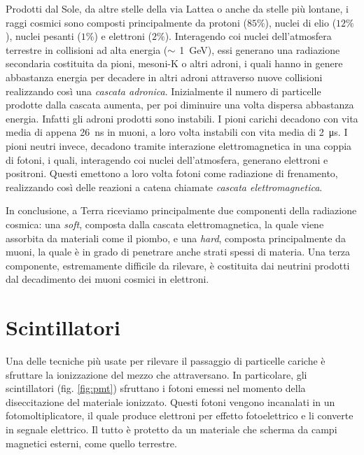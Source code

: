 \documentclass[../main.tex]{subfiles}
\begin{document}
Prodotti dal Sole, da altre stelle della via Lattea o anche da stelle più lontane, i raggi cosmici sono composti principalmente da protoni ($85\%$), nuclei di elio ($12\%$), nuclei pesanti ($1\%$) e elettroni ($2\%$). Interagendo coi nuclei dell'atmosfera terrestre in collisioni ad alta energia ($\small \sim$ \SI{1}{\GeV}), essi generano una radiazione secondaria costituita da pioni, mesoni-K o altri adroni, i quali hanno in genere abbastanza energia per decadere in altri adroni attraverso nuove collisioni realizzando così una \textit{cascata adronica}. Inizialmente il numero di particelle prodotte dalla cascata aumenta, per poi diminuire una volta dispersa abbastanza energia. Infatti gli adroni prodotti sono instabili. I pioni carichi decadono con vita media di appena \SI{26}{\ns} in muoni, a loro volta instabili con vita media di \SI{2}{\micro\s}. I pioni neutri invece, decadono tramite interazione elettromagnetica in una coppia di fotoni, i quali, interagendo coi nuclei dell'atmosfera, generano elettroni e positroni. Questi emettono a loro volta fotoni come radiazione di frenamento, realizzando così delle reazioni a catena chiamate \textit{cascata elettromagnetica}.

In conclusione, a Terra riceviamo principalmente due componenti della radiazione cosmica: una \textit{soft}, composta dalla cascata elettromagnetica, la quale viene assorbita da materiali come il piombo, e una \textit{hard}, composta principalmente da muoni, la quale è in grado di penetrare anche strati spessi di materia. 
Una terza componente, estremamente difficile da rilevare, è costituita dai neutrini prodotti dal decadimento dei muoni cosmici in elettroni.

\section{Scintillatori}
Una delle tecniche più usate per rilevare il passaggio di particelle cariche è sfruttare la ionizzazione del mezzo che attraversano. In particolare, gli scintillatori (fig. \ref{fig:pmt}) sfruttano i fotoni emessi nel momento della diseccitazione del materiale ionizzato. Questi fotoni vengono incanalati in un fotomoltiplicatore, il quale produce elettroni per effetto fotoelettrico e li converte in segnale elettrico. Il tutto è protetto da un materiale che scherma da campi magnetici esterni, come quello terrestre.
\end{document}
